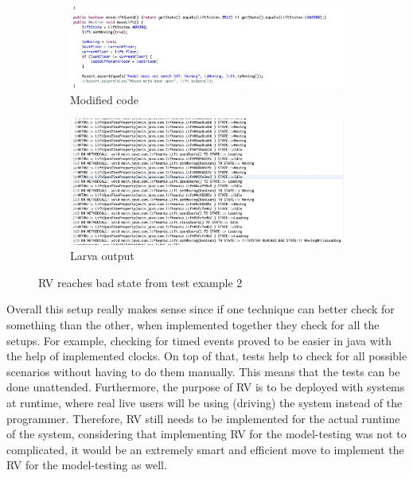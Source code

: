 \documentclass[a4paper, 12pt]{article}
\begin{document}
\begin{figure}[h]
\centering
\begin{subfigure}{.5\textwidth}
  \centering
  \includegraphics[width=\linewidth]{images/larva-test-fail-2-code}
  \caption{Modified code}
\end{subfigure}%
\begin{subfigure}{.5\textwidth}
  \centering
  \includegraphics[width=\linewidth]{images/larva-test-fail-2-output}
  \caption{Larva output}
\end{subfigure}
\caption{RV reaches bad state from test example 2}
\label{fig:larva-test-fail-2}
\end{figure}

Overall this setup really makes sense since if one technique can better check for something than the other, when implemented together they check for all the setups. For example, checking for timed events proved to be easier in java with the help of implemented clocks. On top of that, tests help to check for all possible scenarios without having to do them manually. This means that the tests can be done unattended. Furthermore, the purpose of RV is to be deployed with systems at runtime, where real live users will be using (driving) the system instead of the programmer. Therefore, RV still needs to be implemented for the actual runtime of the system, considering that implementing RV for the model-testing was not to complicated, it would be an extremely smart and efficient move to implement the RV for the model-testing as well. \\
\end{document}
